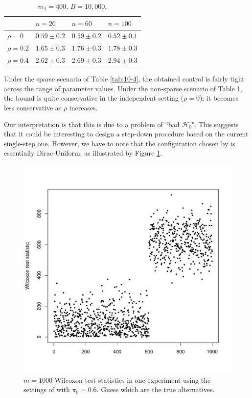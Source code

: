 \documentclass{article}
\begin{document}
\begin{table}[ht]
\centering
\begin{tabular}{llll}
  \hline
 & $n=20$ & $n=60$ & $n=100$ \\ 
  \hline
$\rho=0$ & $0.59\pm0.2$ & $0.59\pm0.2$ & $0.52\pm0.1$ \\ 
  $\rho=0.2$ & $1.65\pm0.3$ & $1.76\pm0.3$ & $1.78\pm0.3$ \\ 
  $\rho=0.4$ & $2.62\pm0.3$ & $2.69\pm0.3$ & $2.94\pm0.3$ \\ 
   \hline
\end{tabular}
\caption{$m_1=400$, $B=10,000$.} 
\label{tab:400-4}
\end{table}
Under the sparse scenario of Table \ref{tab:10-4}, the obtained control is fairly tight across the range of parameter values. Under the non-sparse scenario of Table \ref{tab:400-4}, the bound is quite conservative in the independent setting ($\rho=0$); it becomes less conservative as $\rho$ increases.

Our interpretation is that this is due to a problem of ``bad $\mathcal{H}_0$".  This suggests that it could be interesting to design a step-down procedure based on the current single-step one.   However, we have to note that the configuration chosen by \cite{meinshausen06false} is essentially Dirac-Uniform, as illustrated by Figure \ref{fig:du}.
\begin{figure}
  \centering
  \includegraphics[scale=0.45]{DU}
  \caption{$m=1000$ Wilcoxon test statistics in one experiment using the settings of \cite{meinshausen06false} with $\pi_0=0.6$. Guess which are the true alternatives.}
  \label{fig:du}
\end{figure}
\end{document}
